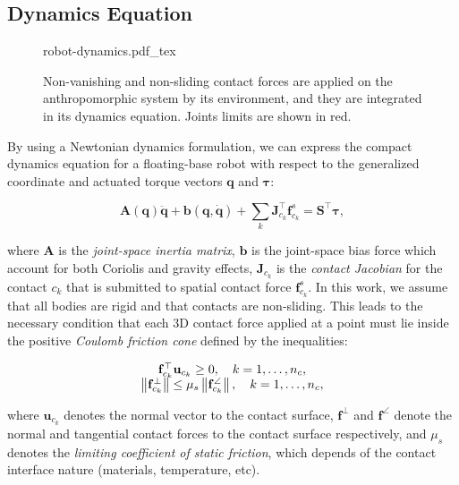 \subsection{Dynamics Equation}

\begin{figure}
  \centering
      {\def\svgwidth{0.4\linewidth}
        
                   {robot-dynamics.pdf_tex}
      }
      \caption{Non-vanishing and non-sliding contact forces are
        applied on the anthropomorphic system by its environment, and
        they are integrated in its dynamics equation. Joints limits
        are shown in red.}
      \label{fig:chap3-robot-dynamics}
\end{figure}

By using a Newtonian dynamics formulation, we can express the compact
dynamics equation for a floating-base robot with respect to the
generalized coordinate and actuated torque vectors $\mathbf{q}$ and
$\boldsymbol{\tau}$:

\begin{equation}
\label{dynamics-equation}
\mathbf{A}(\mathbf{q})\ddot{\mathbf{q}}
+\mathbf{b}(\mathbf{q},\dot{\mathbf{q}})
+\sum_k\mathbf{J}_{c_k}^\top\mathbf{f}^s_{c_k} =
\mathbf{S}^\top\boldsymbol{\tau},
\end{equation}

where $\mathbf{A}$ is the \emph{joint-space inertia matrix},
$\mathbf{b}$ is the joint-space bias force which account for both
Coriolis and gravity effects, $\mathbf{J}_{c_k}$ is the \emph{contact
  Jacobian} for the contact $c_k$ that is submitted to spatial contact
force $\mathbf{f}^s_{c_k}$. In this work, we assume that all bodies
are rigid and that contacts are non-sliding. This leads to the
necessary condition that each 3D contact force applied at a point must
lie inside the positive \emph{Coulomb friction cone} \cite{trinkle1997dynamic}
defined by the inequalities:

\begin{equation}
  \label{eq:chap3-friction-cone}
  \begin{array}{c}
    \mathbf{f}_{c_k}^{\top}\mathbf{u}_{c_k} \ge 0, \quad k=1,\dots,n_c, \\
    \left\lVert \mathbf{f}_{c_k}^\bot \right\rVert \le
    \mu_s\left\lVert \mathbf{f}_{c_k}^\angle \right\rVert, \quad k=1,\dots,n_c,
  \end{array}
\end{equation}

where $\mathbf{u}_{c_k}$ denotes the normal vector to the contact
surface, $\mathbf{f}^\bot$ and $\mathbf{f}^\angle$ denote the normal
and tangential contact forces to the contact surface respectively, and
$\mu_s$ denotes the \emph{limiting coefficient of static friction},
which depends of the contact interface nature (materials, temperature,
etc).

